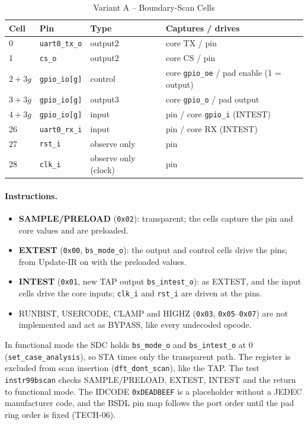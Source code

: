 \begin{table}[H]
\caption{Variant A -- Boundary-Scan Cells}
\label{tab:asBscanCellsA}
\centering
\begin{tabularx}{\textwidth}{|l |l |l |X|}
  \hline
  Cell & Pin & Type & Captures / drives \\
  \hline
  \hline
  0 & \texttt{uart0\_tx\_o} & output2 & core TX / pin \\
  \hline
  1 & \texttt{cs\_o} & output2 & core CS / pin \\
  \hline
  $2+3g$ & \texttt{gpio\_io[g]} & control & core \texttt{gpio\_oe} / pad enable (1 = output) \\
  \hline
  $3+3g$ & \texttt{gpio\_io[g]} & output3 & core \texttt{gpio\_o} / pad output \\
  \hline
  $4+3g$ & \texttt{gpio\_io[g]} & input & pin / core \texttt{gpio\_i} (INTEST) \\
  \hline
  26 & \texttt{uart0\_rx\_i} & input & pin / core RX (INTEST) \\
  \hline
  27 & \texttt{rst\_i} & observe only & pin \\
  \hline
  28 & \texttt{clk\_i} & observe only (clock) & pin \\
  \hline
\end{tabularx}
\end{table}

\paragraph{Instructions.}
\begin{itemize}
  \item \textbf{SAMPLE/PRELOAD} (\texttt{0x02}): transparent; the cells
    capture the pin and core values and are preloaded.
  \item \textbf{EXTEST} (\texttt{0x00}, \texttt{bs\_mode\_o}): the output and
    control cells drive the pins; from Update-IR on with the preloaded values.
  \item \textbf{INTEST} (\texttt{0x01}, new TAP output \texttt{bs\_intest\_o}):
    as EXTEST, and the input cells drive the core inputs; \texttt{clk\_i}
    and \texttt{rst\_i} are driven at the pins.
  \item RUNBIST, USERCODE, CLAMP and HIGHZ (\texttt{0x03}, \texttt{0x05}--\texttt{0x07})
    are not implemented and act as BYPASS, like every undecoded opcode.
\end{itemize}

In functional mode the SDC holds \texttt{bs\_mode\_o} and
\texttt{bs\_intest\_o} at 0 (\texttt{set\_case\_analysis}), so STA times only
the transparent path. The register is excluded from scan insertion
(\texttt{dft\_dont\_scan}), like the TAP. The test
\texttt{instr99bscan} checks SAMPLE/PRELOAD, EXTEST, INTEST and the return to
functional mode.
The IDCODE \texttt{0xDEADBEEF} is a placeholder without a JEDEC
manufacturer code, and the BSDL pin map follows the port order until the
pad ring order is fixed (TECH-06).

